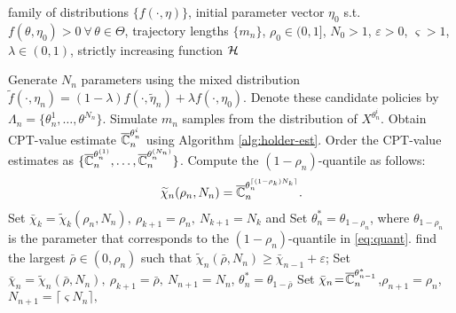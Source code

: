 \begin{algorithm}
\begin{algorithmic}
  family of distributions $\{f(\cdot,\eta)\}$, initial parameter vector $\eta_0$ s.t. $f(\theta,\eta_0)>0 ~\forall\, \theta\in \Theta$, trajectory lengths $\{m_n\}$, 
$\rho_0 \in (0,1]$, $N_0>1$,
$\varepsilon> 0$, $\varsigma>1$, $\lambda \in(0,1)$,
strictly increasing function
$\mathcal{H}\hspace*{-3pt}$.

	\Candidate
	    \State 
	    Generate $N_n$ parameters using the mixed distribution $\widetilde f(\cdot,\eta_n)= (1-\lambda)f(\cdot,\widetilde\eta_n)+\lambda f(\cdot,\eta_0)$. 
	    \State Denote these candidate policies by $\Lambda_n=\{\theta^1_n, \ldots, \theta^{N_n}\}$.
	\EndCandidate    
	\Estimation
	      \State Simulate $m_n$ samples from the distribution of $X^{\theta^i_n}$.
	      \State Obtain CPT-value estimate $\overline {\mathbb{C}}_n^{\theta^i_n}$ using Algorithm \ref{alg:holder-est}.
	      \EndFor
	\EndEstimation
	\Elite
	  \State Order the CPT-value estimates as $\{\overline {\mathbb{C}}_n^{\theta^{(1)}_n},\ldots,\overline {\mathbb{C}}_n^{\theta^{(N_n)}_n}\}$. 
	  \State Compute the $(1-\rho_n)$-quantile as follows: 
	  \begin{align}
\widetilde \chi_{n}(\rho_n,N_n) = \overline {\mathbb{C}}_n^{\theta^{\lceil(1-\rho_k)N_k \rceil}_n}.\label{eq:quant}
\end{align}
	\EndElite
	\Thresholding
	    \State Set $\bar \chi_{k} = \widetilde \chi_{k}(\rho_n,N_n),~\rho_{k+1} = \rho_n,~N_{k+1} = N_{k}$ and \label{step:3a}
	    \State Set $\theta^*_{n} = \theta_{1-\rho_{n}}$, where $\theta_{1-\rho_{n}}$ is the parameter that corresponds to the $(1-\rho_n)$-quantile in \eqref{eq:quant}.
	\Else
             \State find the largest $\bar \rho \in (0, \rho_n)$ such that $\widetilde\chi_{n}(\bar \rho,N_n)\geq \bar\chi_{n-1}+\varepsilon$;             
              \State Set $\bar \chi_{n}\! =\! \widetilde \chi_{n}(\bar \rho,N_n),~ \rho_{k+1}  \!=\! \bar \rho,~N_{n+1} \!=\! N_{n}$, 
              $\theta^*_{n} \!=\! \theta_{1- \bar \rho}$ \label{step:3b} \vspace{-3ex}
              \Else
	      \State Set $\bar \chi_{n}  \!=\! \overline {\mathbb{C}}_n^{\theta^*_{n-1}}$,$\rho_{n+1} \!=\! \rho_n$,$N_{n+1} \!=\! \lceil\varsigma N_{n}\rceil,$ 

\end{algorithmic}
\end{algorithm}
